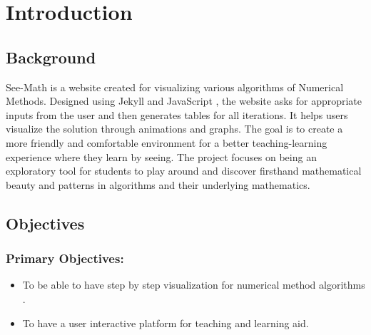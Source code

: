 




\chapter{Introduction}

\section{{\bf{Background}}}

See-Math is a website created for visualizing various algorithms of Numerical Methods\cite{dahlquist2003numerical}. Designed using Jekyll \cite{jekyll} and JavaScript \cite{jsx}, the website asks for appropriate inputs from the user and then generates tables for all iterations. It helps users visualize the solution through animations and graphs. The goal is to create a more friendly and comfortable environment for a better teaching-learning experience where they learn by seeing. The project focuses on being an exploratory tool for students to play around and discover firsthand mathematical beauty and patterns in algorithms and their underlying mathematics.






\section{{\bf{Objectives}}}

\subsection{Primary Objectives:}
\begin{itemize}
	\item To be able to have step by step visualization for numerical method algorithms \cite{mathews2004numerica}.
	\item To have a user interactive platform for teaching and learning aid.
\end{itemize}

